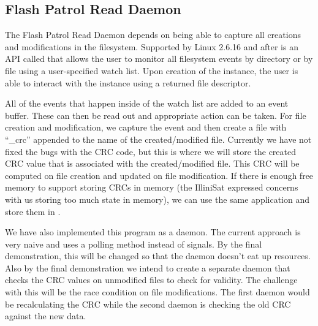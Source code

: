 \subsection{Flash Patrol Read Daemon}
The Flash Patrol Read Daemon depends on being able to capture all creations 
and modifications in the filesystem. Supported by Linux 2.6.16 and after is an API
called  that allows the user to monitor all filesystem events by directory or by 
file using a user-specified watch list. Upon creation of the  instance, the user is able to 
interact with the instance using a returned file descriptor. 

All of the events that happen inside of the watch list are added to an
 event buffer. 
These can then be read out and appropriate action can be taken. For file creation and 
modification, we capture the event and then create a file with ``\_crc'' appended to 
the name of the created/modified file. Currently we have not fixed the bugs with 
the CRC code, but this is where we will store the created CRC value that is 
associated with the created/modified file. This CRC will be computed on file creation
and updated on file modification. If there is enough free memory to support
storing CRCs in memory (the IlliniSat expressed concerns with us storing too
much state in memory), we can use the same application and store them in
.

We have also implemented this program as a daemon. The current approach is very
naive and uses a polling method instead of signals. By the final demonstration, this
will be changed so that the daemon doesn't eat up resources. Also by the final
demonstration we intend to create a separate daemon that checks the CRC 
values on unmodified files to check for validity. The challenge with this will be
the race condition on file modifications. The first daemon would be recalculating
the CRC while the second daemon is checking the old CRC against the new data.






